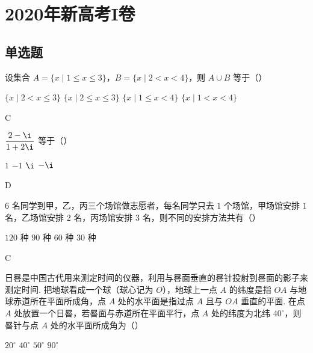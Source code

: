 \chapter{2020年新高考I卷}

\section{单选题}

\begin{problem}
设集合 \(A=\{x\mid 1\le x\le 3\}\)，\(B=\{x\mid 2<x<4\}\)，则 \(A\cup B\) 等于（\quad）

\choices
    {\(\{x\mid 2<x\le 3\}\)}
    {\(\{x\mid 2\le x\le 3\}\)}
    {\(\{x\mid 1\le x<4\}\)}
    {\(\{x\mid 1<x<4\}\)}
\end{problem}

\begin{answer}
C
\end{answer}

\begin{problem}
\(\dfrac{2-\i}{1+2\i}\) 等于（\quad）

\choices
    {\(1\)}
    {\(-1\)}
    {\(\i\)}
    {\(-\i\)}
\end{problem}

\begin{answer}
D
\end{answer}

\begin{problem}
\(6\) 名同学到甲，乙，丙三个场馆做志愿者，每名同学只去 \(1\) 个场馆，甲场馆安排 \(1\) 名，乙场馆安排 \(2\) 名，丙场馆安排 \(3\) 名，则不同的安排方法共有（\quad）

\choices
    {\(120\) 种}
    {\(90\) 种}
    {\(60\) 种}
    {\(30\) 种}
\end{problem}

\begin{answer}
C
\end{answer}

\begin{problem}
日晷是中国古代用来测定时间的仪器，利用与晷面垂直的晷针投射到晷面的影子来测定时间. 把地球看成一个球（球心记为 \(O\)），地球上一点 \(A\) 的纬度是指 \(OA\) 与地球赤道所在平面所成角，点 \(A\) 处的水平面是指过点 \(A\) 且与 \(OA\) 垂直的平面. 在点 \(A\) 处放置一个日晷，若晷面与赤道所在平面平行，点 \(A\) 处的纬度为北纬 \(40^\circ\)，则晷针与点 \(A\) 处的水平面所成角为（\quad）

\begin{center}
\end{center}

\choices
    {\(20^\circ\)}
    {\(40^\circ\)}
    {\(50^\circ\)}
    {\(90^\circ\)}
\end{problem}

